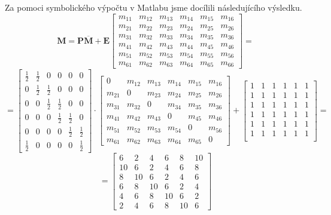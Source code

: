 \documentclass{article}
\begin{document}
			Za pomoci symbolického výpočtu v Matlabu jsme docílili následujícího výsledku.
			\[\mathbf{M}=\mathbf{P}\overline{\mathbf{M}}+\mathbf{E}
			\begin{bmatrix}
				m_{11}&m_{12}&m_{13}&m_{14}&m_{15}&m_{16}\\
				m_{21}&m_{22}&m_{23}&m_{24}&m_{25}&m_{26}\\
				m_{31}&m_{32}&m_{33}&m_{34}&m_{35}&m_{36}\\
				m_{41}&m_{42}&m_{43}&m_{44}&m_{45}&m_{46}\\
				m_{51}&m_{52}&m_{53}&m_{54}&m_{55}&m_{56}\\
				m_{61}&m_{62}&m_{63}&m_{64}&m_{65}&m_{66}
			\end{bmatrix}=\] 
			\[=\begin{bmatrix}
				\frac{1}{2}&\frac{1}{2}&0&0&0&0\\
				0&\frac{1}{2}&\frac{1}{2}&0&0&0\\
				0&0&\frac{1}{2}&\frac{1}{2}&0&0\\
				0&0&0&\frac{1}{2}&\frac{1}{2}&0\\
				0&0&0&0&\frac{1}{2}&\frac{1}{2}\\
				\frac{1}{2}&0&0&0&0&\frac{1}{2}
			\end{bmatrix}\cdot
			\begin{bmatrix}
				0&m_{12}&m_{13}&m_{14}&m_{15}&m_{16}\\
				m_{21}&0&m_{23}&m_{24}&m_{25}&m_{26}\\
				m_{31}&m_{32}&0&m_{34}&m_{35}&m_{36}\\
				m_{41}&m_{42}&m_{43}&0&m_{45}&m_{46}\\
				m_{51}&m_{52}&m_{53}&m_{54}&0&m_{56}\\
				m_{61}&m_{62}&m_{63}&m_{64}&m_{65}&0
			\end{bmatrix} + 
			\begin{bmatrix}
				1&1&1&1&1&1\\
				1&1&1&1&1&1\\
				1&1&1&1&1&1\\
				1&1&1&1&1&1\\
				1&1&1&1&1&1\\
				1&1&1&1&1&1\\
			\end{bmatrix}=\]
			\[=\begin{bmatrix}
				6&2&4&6&8&10\\
				10&6&2&4&6&8\\
				8&10&6&2&4&6\\
				6&8&10&6&2&4\\
				4&6&8&10&6&2\\
				2&4&6&8&10&6
			\end{bmatrix}\]
\end{document}
